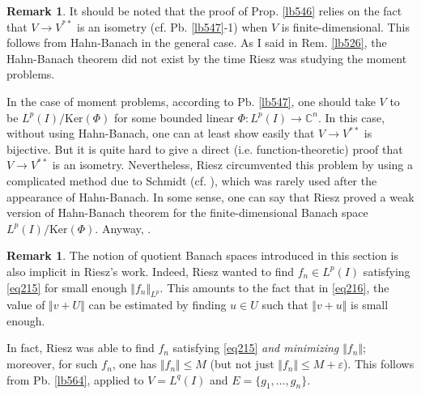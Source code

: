 \documentclass[12pt,b5paper,notitlepage]{article}
\theoremstyle{definition}
\newtheorem{rem}[df]{Remark}
\theoremstyle{plain}
\newcommand{\Cbb}{\mathbb C}
\newcommand{\Ker}{\mathrm{Ker}}
\newcommand{\eps}{\varepsilon}
\numberwithin{equation}{section}
\begin{document}
\begin{rem}
It should be noted that the proof of Prop. \ref{lb546} relies on the fact that $V\rightarrow V^{**}$ is an isometry (cf. Pb. \ref{lb547}-1) when $V$ is finite-dimensional. This follows from Hahn-Banach in the general case. As I said in Rem. \ref{lb526}, the Hahn-Banach theorem did not exist by the time Riesz was studying the moment problems.

In the case of moment problems, according to Pb. \ref{lb547}, one should take $V$ to be $L^p(I)/\Ker(\Phi)$ for some bounded linear $\Phi:L^p(I)\rightarrow\Cbb^n$. In this case, without using Hahn-Banach, one can at least show easily that $V\rightarrow V^{**}$ is bijective. But it is quite hard to give a direct (i.e. function-theoretic) proof that $V\rightarrow V^{**}$ is an isometry.  Nevertheless, Riesz circumvented this problem by using a complicated method due to Schmidt (cf. \cite[Sec. 6.2 and 5.3]{Die-H}), which was rarely used after the appearance of Hahn-Banach. In some sense, one can say that Riesz proved a weak version of Hahn-Banach theorem for the finite-dimensional Banach space $L^p(I)/\Ker(\Phi)$. Anyway, . %
\hfill\qedsymbol
\end{rem}

\begin{rem}
The notion of quotient Banach spaces introduced in this section is also implicit in Riesz's work. Indeed, Riesz wanted to find $f_n\in L^p(I)$ satisfying \eqref{eq215} for small enough $\Vert f_n\Vert_{L^p}$. This amounts to the fact that in \eqref{eq216}, the value of  $\Vert v+U\Vert$ can be estimated by finding $u\in U$ such that $\Vert v+u\Vert$ is small enough. 

In fact, Riesz was able to find $f_n$ satisfying \eqref{eq215} \textit{and minimizing $\Vert f_n\Vert$}; moreover, for such $f_n$, one has $\Vert f_n\Vert\leq M$ (but not just $\Vert f_n\Vert\leq M+\eps$). This follows from Pb. \ref{lb564}, applied to $V=L^q(I)$ and $E=\{g_1,\dots,g_n\}$.%
\hfill\qedsymbol
\end{rem}
\end{document}

